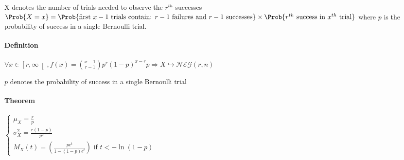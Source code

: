 X denotes the number of trials needed to observe the $r^{th}$ successes
$\Prob{X=x}=\Prob{\text{first }x-1\text{ trials contain: }r-1\text{ failures and }r-1\text{ successes}}\times\Prob{r^{th}\text{ success in }x^{th}\text{ trial}}$
where $p$ is the probability of success in a single Bernoulli trial.
\paragraph{Definition}
\begin{center}
	$\forall x\in \left[ r,\infty \right[, f(x)= {x-1\choose r-1}p^{r}(1-p)^{x-r}p\Rightarrow X\hookrightarrow\mathcal{NEG}(r,n)$
\end{center}
$p$ denotes the probability of success in a single Bernoulli trial
\paragraph{Theorem}
\begin{center}
$\begin{cases}
	\mu_{X}=\frac{r}{p}\\
	\sigma_{X}^{2} = \frac{r(1-p)}{p^{2}}\\
	M_{X}(t)=\left(\frac{pe^{t}}{1-(1-p)e^{t}}\right)\text{ if }t<-\ln(1-p)
\end{cases}$
\end{center}
